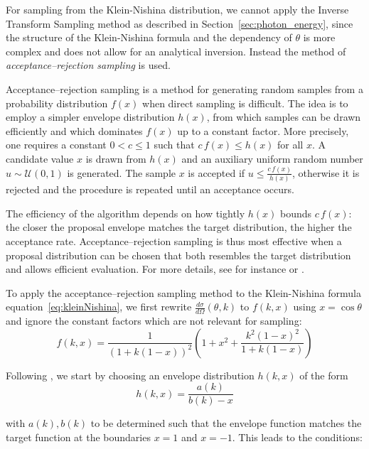 For sampling from the Klein-Nishina distribution, we cannot apply the Inverse
Transform Sampling method as described in Section~\ref{sec:photon_energy}, 
since the structure of the Klein-Nishina formula and the dependency of $\theta$
is more complex and does not allow for an analytical inversion.
Instead the method of \emph{acceptance--rejection sampling} is used. 

Acceptance--rejection sampling is a method for generating random samples from a
probability distribution $f(x)$ when direct sampling is difficult. The idea is
to employ a simpler envelope distribution $h(x)$, from which samples can be
drawn efficiently and which dominates $f(x)$ up to a constant factor. More
precisely, one requires a constant $0< c \leq 1$ such that $c\,f(x) \leq h(x)$
for all $x$. A candidate value $x$ is drawn from $h(x)$ and an auxiliary
uniform random number $u \sim \mathcal{U}(0,1)$ is generated. The sample $x$ is
accepted if $u \leq \tfrac{c\,f(x)}{h(x)}$, otherwise it is rejected and the
procedure is repeated until an acceptance occurs.

The efficiency of the algorithm depends on how tightly $h(x)$ bounds $c\,f(x)$:
the closer the proposal envelope matches the target distribution, the higher the
acceptance rate. Acceptance--rejection sampling is thus most effective when a
proposal distribution can be chosen that both resembles the target distribution
and allows efficient evaluation. For more details, see for instance \cite[Chap 4]{muller2012monte} or \cite[Section 8.1]{leobacher2014introduction}.

To apply the acceptance--rejection sampling method to the Klein-Nishina formula equation~\eqref{eq:kleinNishina}, we first rewrite $\frac{d\sigma}{d\Omega} (\theta, k)$ to $f(k,x)$ using $x=\cos\theta$ and ignore the constant factors which are not relevant for sampling:
\begin{equation}
    f(k,x) = \frac{1}{(1 + k(1 - x))^2} \left( 1 + x^2 + \frac{k^2 (1 - x)^2}{1+ k(1 - x)} \right)
\end{equation}

Following \cite{ozmutlu1992sampling}, we start by choosing an envelope distribution $h(k,x)$ of the form
\begin{equation*}
    h(k,x) = \frac{a(k)}{b(k)-x}
\end{equation*}

with $a(k), b(k)$ to be determined such that the envelope function matches the target function at the boundaries $x=1$ and $x=-1$. This leads to the conditions:

